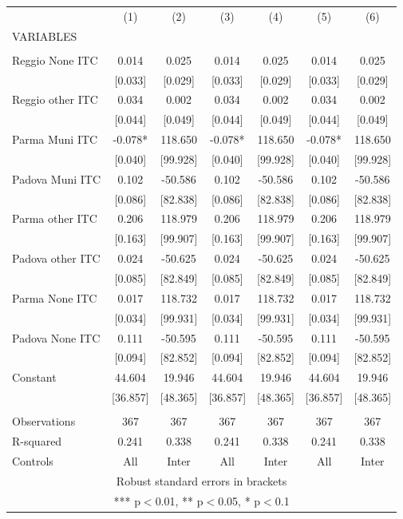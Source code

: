 \begin{tabular}{lcccccc} \hline
 & (1) & (2) & (3) & (4) & (5) & (6) \\
VARIABLES &  &  &  &  &  &  \\ \hline
 &  &  &  &  &  &  \\
Reggio None ITC & 0.014 & 0.025 & 0.014 & 0.025 & 0.014 & 0.025 \\
 & [0.033] & [0.029] & [0.033] & [0.029] & [0.033] & [0.029] \\
Reggio other ITC & 0.034 & 0.002 & 0.034 & 0.002 & 0.034 & 0.002 \\
 & [0.044] & [0.049] & [0.044] & [0.049] & [0.044] & [0.049] \\
Parma Muni ITC & -0.078* & 118.650 & -0.078* & 118.650 & -0.078* & 118.650 \\
 & [0.040] & [99.928] & [0.040] & [99.928] & [0.040] & [99.928] \\
Padova Muni ITC & 0.102 & -50.586 & 0.102 & -50.586 & 0.102 & -50.586 \\
 & [0.086] & [82.838] & [0.086] & [82.838] & [0.086] & [82.838] \\
Parma other ITC & 0.206 & 118.979 & 0.206 & 118.979 & 0.206 & 118.979 \\
 & [0.163] & [99.907] & [0.163] & [99.907] & [0.163] & [99.907] \\
Padova other ITC & 0.024 & -50.625 & 0.024 & -50.625 & 0.024 & -50.625 \\
 & [0.085] & [82.849] & [0.085] & [82.849] & [0.085] & [82.849] \\
Parma None ITC & 0.017 & 118.732 & 0.017 & 118.732 & 0.017 & 118.732 \\
 & [0.034] & [99.931] & [0.034] & [99.931] & [0.034] & [99.931] \\
Padova None ITC & 0.111 & -50.595 & 0.111 & -50.595 & 0.111 & -50.595 \\
 & [0.094] & [82.852] & [0.094] & [82.852] & [0.094] & [82.852] \\
Constant & 44.604 & 19.946 & 44.604 & 19.946 & 44.604 & 19.946 \\
 & [36.857] & [48.365] & [36.857] & [48.365] & [36.857] & [48.365] \\
 &  &  &  &  &  &  \\
Observations & 367 & 367 & 367 & 367 & 367 & 367 \\
R-squared & 0.241 & 0.338 & 0.241 & 0.338 & 0.241 & 0.338 \\
 Controls & All & Inter & All & Inter & All & Inter \\ \hline
\multicolumn{7}{c}{ Robust standard errors in brackets} \\
\multicolumn{7}{c}{ *** p$<$0.01, ** p$<$0.05, * p$<$0.1} \\
\end{tabular}
